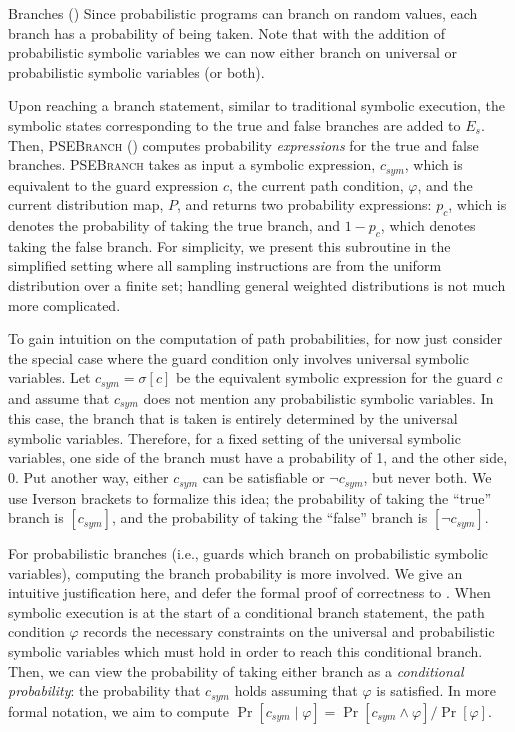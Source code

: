 \documentclass[acmsmall,review,anonymous]{acmart}\settopmatter{printfolios=true,printccs=false,printacmref=false}
\begin{document}
\begin{paragraph}{Branches ()}
  Since probabilistic programs can branch on random values, each branch has a probability of being taken.
	Note that with the addition of probabilistic symbolic variables we can now either branch on universal or probabilistic symbolic variables (or both).

  
	Upon reaching a branch statement, similar to traditional symbolic execution, the symbolic states corresponding to the true and false branches are added to $E_s$.
  Then, \textsc{PSEBranch} () computes probability \textit{expressions} for the true and false branches.
  \textsc{PSEBranch} takes as input a symbolic expression, $c_{sym}$, which is equivalent to the guard expression $c$, the current path condition, $\varphi$, and the current distribution map, $P$, and returns two probability expressions: $p_c$, which is denotes the probability of taking the true branch, and $1-p_c$, which denotes taking the false branch.
  For simplicity, we present this subroutine in the simplified setting where all
  sampling instructions are from the uniform distribution over a finite set;
  handling general weighted distributions is not much more complicated.
	
	To gain intuition on the computation of path probabilities, for now just consider the special case where the guard condition only involves universal symbolic variables.
  Let $c_{sym} = \sigma[c]$ be the equivalent symbolic expression for the guard $c$ and assume that $c_{sym}$ does not mention any probabilistic symbolic variables.
  In this case, the branch that is taken is entirely determined by the universal symbolic variables. 
	Therefore, for a fixed setting of the universal symbolic variables, one side of the branch must have a probability of 1, and the other side, 0.
  Put another way, either $c_{sym}$ can be satisfiable or $\neg c_{sym}$, but never both.
	We use Iverson brackets to formalize this idea; the probability of taking the ``true'' branch is $[c_{sym}]$, and the probability of taking the ``false'' branch is $[\neg c_{sym}]$.
	
	
	For probabilistic branches (i.e., guards which branch on probabilistic symbolic variables), computing the branch probability is more involved.
  We give an intuitive justification here, and defer the formal proof of correctness to .
  When symbolic execution is at the start of a conditional branch statement, the path condition $\varphi$ records the necessary constraints on the universal and probabilistic symbolic variables which must hold in order to reach this conditional branch. 
  Then, we can view the probability of taking either branch as a \textit{conditional probability}: the probability that $c_{sym}$ holds assuming that $\varphi$ is satisfied.
	In more formal notation, we aim to compute $\Pr[c_{sym} \mid \varphi] = {\Pr[c_{sym}\wedge \varphi]}/{\Pr[\varphi]}$.
	


\end{paragraph}
\end{document}
